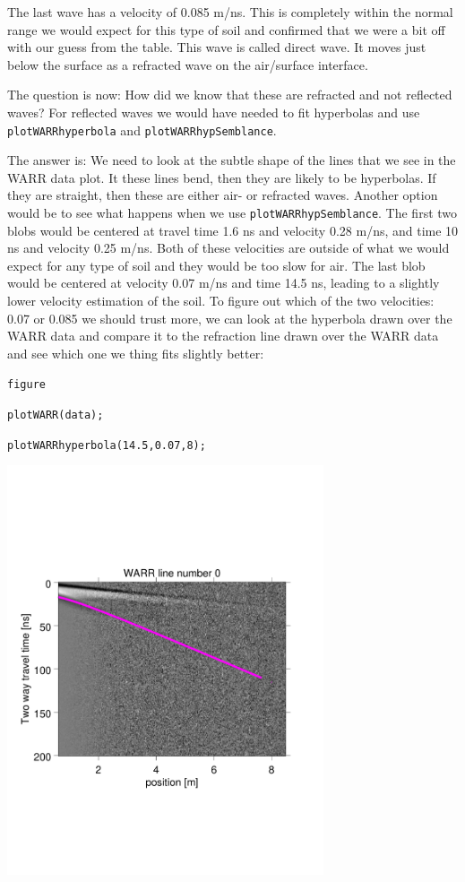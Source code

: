 \documentclass[11pt]{article}
\begin{document}
The last wave has a velocity of 0.085 m/ns. This is completely within
the normal range we would expect for this type of soil and confirmed
that we were a bit off with our guess from the table. This wave is
called direct wave. It moves just below the surface as a refracted
wave on the air/surface interface.

The question is now: How did we know that these are refracted and not
reflected waves? For reflected waves we would have needed to fit
hyperbolas and use \verb#plotWARRhyperbola# and
\verb#plotWARRhypSemblance#.

The answer is: We need to look at the subtle shape of the lines that
we see in the WARR data plot. It these lines bend, then they are
likely to be hyperbolas. If they are straight, then these are either
air- or refracted waves. Another option would be to see what happens
when we use \verb#plotWARRhypSemblance#.  The first two blobs would be
centered at travel time 1.6 ns and velocity 0.28 m/ns, and time 10 ns
and velocity 0.25 m/ns. Both of these velocities are outside of what
we would expect for any type of soil and they would be too slow for
air. The last blob would be centered at velocity 0.07 m/ns and time
14.5 ns, leading to a slightly lower velocity estimation of the
soil. To figure out which of the two velocities: 0.07 or 0.085 we
should trust more, we can look at the hyperbola drawn over the WARR
data and compare it to the refraction line drawn over the WARR data
and see which one we thing fits slightly better:

\qquad \verb#figure#

\qquad \verb#plotWARR(data);#

\qquad \verb#plotWARRhyperbola(14.5,0.07,8);#

\begin{center}
  \includegraphics[width=0.7\textwidth,trim = 0.9cm 6cm 2cm
    6.5cm,clip]{figures/WARRhyperb}
\end{center}
\end{document}
